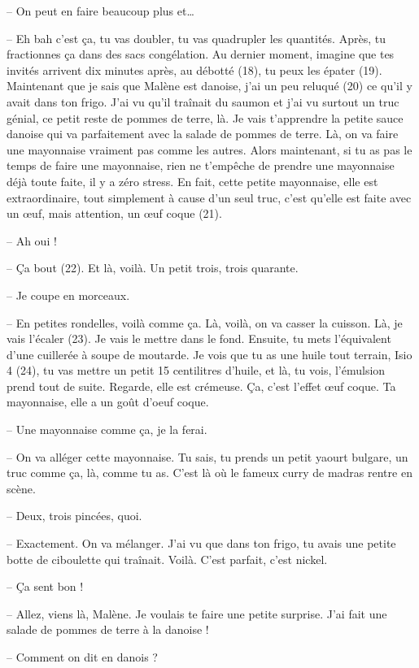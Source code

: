 \documentclass[11pt, french]{report}
\begin{document}
-- On peut en faire beaucoup plus et…

-- Eh bah c’est ça, tu vas doubler, tu vas quadrupler les quantités. Après, tu
fractionnes ça dans des sacs congélation. Au dernier moment, imagine que tes
invités arrivent dix minutes après, au débotté (18), tu peux les épater (19).
Maintenant que je sais que Malène est danoise, j’ai un peu reluqué (20) ce qu’il
y avait dans ton frigo. J’ai vu qu’il traînait du saumon et j’ai vu surtout un
truc génial, ce petit reste de pommes de terre, là. Je vais t’apprendre la petite
sauce danoise qui va parfaitement avec la salade de pommes de terre. Là, on va
faire une mayonnaise vraiment pas comme les autres. Alors maintenant, si tu as
pas le temps de faire une mayonnaise, rien ne t’empêche de prendre une mayonnaise
déjà toute faite, il y a zéro stress. En fait, cette petite mayonnaise, elle est
extraordinaire, tout simplement à cause d’un seul truc, c’est qu’elle est faite
avec un œuf, mais attention, un œuf coque (21).

-- Ah oui !

-- Ça bout (22). Et là, voilà. Un petit trois, trois quarante.

-- Je coupe en morceaux.

-- En petites rondelles, voilà comme ça. Là, voilà, on va casser la cuisson. Là, je
vais l’écaler (23). Je vais le mettre dans le fond. Ensuite, tu mets l’équivalent
d’une cuillerée à soupe de moutarde. Je vois que tu as une huile tout terrain,
Isio 4 (24), tu vas mettre un petit 15 centilitres d’huile, et là, tu vois,
l’émulsion prend tout de suite. Regarde, elle est crémeuse. Ça, c’est l’effet œuf
coque. Ta mayonnaise, elle a un goût d’oeuf coque.

-- Une mayonnaise comme ça, je la ferai.

-- On va alléger cette mayonnaise. Tu sais, tu prends un petit yaourt bulgare, un
truc comme ça, là, comme tu as. C’est là où le fameux curry de madras rentre en
scène.

-- Deux, trois pincées, quoi.

-- Exactement. On va mélanger. J’ai vu que dans ton frigo, tu avais une petite
botte de ciboulette qui traînait. Voilà. C’est parfait, c’est nickel.

-- Ça sent bon !

-- Allez, viens là, Malène. Je voulais te faire une petite surprise. J’ai fait
une salade de pommes de terre à la danoise !

-- Comment on dit en danois ?
\end{document}
